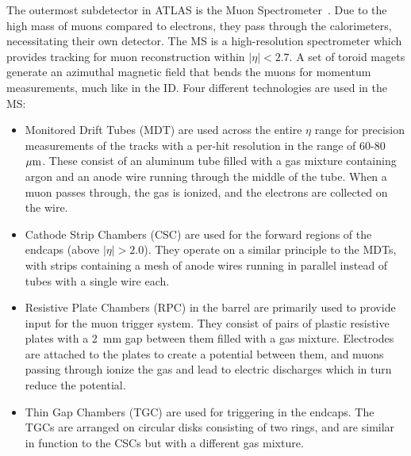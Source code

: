 The outermost subdetector in ATLAS is the Muon Spectrometer~\cite{1997.ms-tdr}.
Due to the high mass of muons compared to electrons, they pass through the calorimeters, necessitating their own detector.
The MS is a high-resolution spectrometer which provides tracking for muon reconstruction within $|\eta| < 2.7$.
A set of toroid magets generate an azimuthal magnetic field that bends the muons for momentum measurements, much like in the ID.
Four different technologies are used in the MS:
\begin{itemize}
\item Monitored Drift Tubes (MDT) are used across the entire $\eta$ range for precision measurements of the tracks with a per-hit resolution in the range of 60-80~$\mu\textrm{m}$.
These consist of an aluminum tube filled with a gas mixture containing argon and an anode wire running through the middle of the tube.
When a muon passes through, the gas is ionized, and the electrons are collected on the wire.
\item Cathode Strip Chambers (CSC) are used for the forward regions of the endcaps (above $|\eta| > 2.0$).
They operate on a similar principle to the MDTs, with strips containing a mesh of anode wires running in parallel instead of tubes with a single wire each.
\item Resistive Plate Chambers (RPC) in the barrel are primarily used to provide input for the muon trigger system.
They consist of pairs of plastic resistive plates with a 2~mm gap between them filled with a gas mixture.
Electrodes are attached to the plates to create a potential between them, and muons passing through ionize the gas and lead to electric discharges which in turn reduce the potential.
\item Thin Gap Chambers (TGC) are used for triggering in the endcaps.
The TGCs are arranged on circular disks consisting of two rings, and are similar in function to the CSCs but with a different gas mixture.
\end{itemize}
